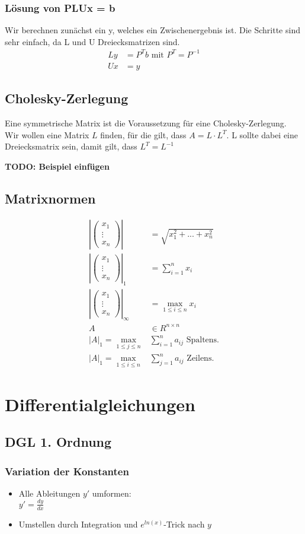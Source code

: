 \documentclass[a4paper, 11pt]{article}
\newcommand{\bspVec}{\ensuremath{\begin{pmatrix} x_1\\ \vdots \\ x_n \end{pmatrix}}}
\begin{document}
\begin{multicols}{3}
\begin{small}
			\subsubsection{Lösung von PLUx = b}
				Wir berechnen zunächst ein y, welches ein Zwischenergebnis ist. Die Schritte sind sehr einfach, da L und U Dreiecksmatrizen sind.
				\begin{align*}
					Ly &= P^Tb \text{ mit } P^T = P^{-1}\\
					Ux &= y
				\end{align*}
		\subsection{Cholesky-Zerlegung}
			Eine symmetrische Matrix ist die Voraussetzung für eine Cholesky-Zerlegung.
			Wir wollen eine Matrix $L$ finden, für die gilt, dass $A = L \cdot L^{T}$. L sollte dabei eine Dreiecksmatrix sein, damit gilt, dass $L^T = L^{-1}$
			
			\textbf{TODO: Beispiel einfügen}
		\subsection{Matrixnormen}
			\begin{align*}
				\left|\bspVec\right| &= \sqrt{x_1^2 + ... + x_n^2}\\
				\left|\bspVec\right|_1 &= \sum_{i = 1}^{n} x_i\\
				\left|\bspVec\right|_\infty &= \max_{1 \le i \le n} x_i\\
				A &\in R^{n \times n}\\
				\left|A\right|_1 = \max_{1 \le j \le n} &\sum_{i = 1}^{n} a_{ij} \text{ Spaltens.} \\
				\left|A\right|_1 = \max_{1 \le i \le n} &\sum_{j = 1}^{n} a_{ij} \text{ Zeilens.} 
			\end{align*}
	\section{Differentialgleichungen}
		\subsection{DGL 1. Ordnung}	
			\subsubsection{Variation der Konstanten}
				\begin{itemize}
					\item Alle Ableitungen $y'$ umformen: \\
						  $y' = \frac{dy}{dx}$
					\item Umstellen durch Integration und $e^{ln(x)}$-Trick nach $y$
				\end{itemize}

\end{small}
\end{multicols}
\end{document}
